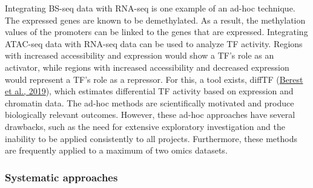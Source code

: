 \documentclass[12pt,twoside]{reedthesis}
\begin{document}
Integrating BS-seq data with RNA-seq is one example of an ad-hoc
technique. The expressed genes are known to be demethylated. As a
result, the methylation values of the promoters can be linked to the
genes that are expressed. Integrating ATAC-seq data with RNA-seq data
can be used to analyze TF activity. Regions with increased accessibility
and expression would show a TF's role as an activator, while regions
with increased accessibility and decreased expression would represent a
TF's role as a repressor. For this, a tool exists, diffTF (\protect\hyperlink{ref-berest2019}{Berest et al., 2019}),
which estimates differential TF activity based on expression and
chromatin data. The ad-hoc methods are scientifically motivated and
produce biologically relevant outcomes. However, these ad-hoc approaches
have several drawbacks, such as the need for extensive exploratory
investigation and the inability to be applied consistently to all
projects. Furthermore, these methods are frequently applied to a maximum
of two omics datasets.

\hypertarget{systematic-approaches}{%
\subsubsection*{Systematic approaches}\label{systematic-approaches}}
\end{document}
